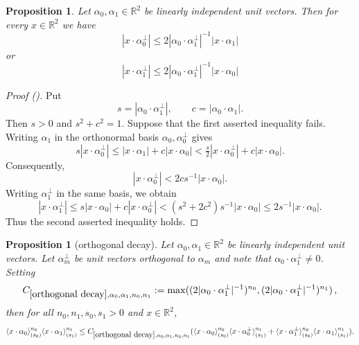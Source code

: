 \documentclass[12pt,reqno]{amsart}
\newcommand{\auto}{{({\tiny\faCar})}}
\theoremstyle{plain}
\newtheorem{proposition}[theorem]{Proposition}
\numberwithin{equation}{section}
\theoremstyle{remark}
\newcommand{\using}[1]{}
\newcommand{\R}{{\mathbb R}}
\begin{document}
\begin{proposition}\label{orthogonal domination}
Let     $\alpha_0 ,\alpha_1\in\mathbb{R}^2$ be linearly independent unit vectors.
Then for every $x\in \R^2$ we have
 \begin{equation}\label{auto:orthogonal-coordinate-first-bound}
     |x\cdot \alpha_0^\perp|\le  2|\alpha_0\cdot \alpha_1^\perp|^{-1}| x\cdot \alpha_1|
 \end{equation}
or
 \begin{equation}\label{auto:orthogonal-coordinate-second-bound}
     | x\cdot \alpha_1^\perp|\le   2| \alpha_0\cdot \alpha_1^\perp|^{-1}|x\cdot \alpha_0|
 \end{equation}
\end{proposition}
\begin{proof}[Proof \auto]
Put
\[
s=|\alpha_0\cdot\alpha_1^\perp|,
\qquad
c=|\alpha_0\cdot\alpha_1|.
\]
Then $s>0$ and $s^2+c^2=1$. Suppose that the first asserted inequality fails. Writing $\alpha_1$ in the orthonormal basis $\alpha_0,\alpha_0^\perp$ gives
\[
s|x\cdot\alpha_0^\perp|
\le |x\cdot\alpha_1|+c|x\cdot\alpha_0|
<\tfrac{s}{2}|x\cdot\alpha_0^\perp|+c|x\cdot\alpha_0|.
\]
Consequently,
\[
|x\cdot\alpha_0^\perp|<2cs^{-1}|x\cdot\alpha_0|.
\]
Writing $\alpha_1^\perp$ in the same basis, we obtain
\[
|x\cdot\alpha_1^\perp|
\le s|x\cdot\alpha_0|+c|x\cdot\alpha_0^\perp|
<(s^2+2c^2)s^{-1}|x\cdot\alpha_0|
\le2s^{-1}|x\cdot\alpha_0|.
\]
Thus the second asserted inequality holds.
\end{proof}
\begin{proposition}[orthogonal decay]\label{orthogonal decay}\using{compare brackets}\using{orthogonal domination}
Let $\alpha_0,\alpha_1\in\mathbb{R}^2$ be linearly independent unit vectors.
Let $\alpha_{m}^\perp$ be unit vectors orthogonal to $\alpha_m$ and note that $\alpha_0\cdot \alpha_1^\perp\neq 0$. Setting \begin{equation}\label{auto:orthogonal-decay-constant}
    C_{\ref{orthogonal decay}, \alpha_0,\alpha_1,n_0,n_1}:=\max( (2 |\alpha_0\cdot \alpha_1^\perp|^{-1})^{n_0},(2 |\alpha_0\cdot \alpha_1^\perp|^{-1})^{n_1}) \, ,
\end{equation}
then for all $n_0,n_1,s_0,s_1>0$ and $x\in\mathbb{R}^2$,
\begin{equation}\label{eq:two bump}
    \langle x\cdot \alpha_0\rangle_{(s_0)}^{n_0} \langle x\cdot \alpha_1\rangle_{(s_1)}^{n_1}
\le C_{\ref{orthogonal decay},\alpha_0,\alpha_1,n_0,n_1} (\langle x\cdot \alpha_0\rangle_{(s_0)}^{n_0} \langle x\cdot \alpha_0^\perp\rangle_{(s_1)}^{n_1} +
\langle x\cdot \alpha_1^\perp\rangle_{(s_0)}^{n_0} \langle x\cdot \alpha_1\rangle_{(s_1)}^{n_1}).
\end{equation}
\end{proposition}
\end{document}
